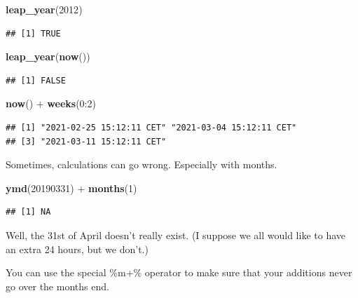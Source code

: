 \documentclass[]{tufte-book}
\newenvironment{Shaded}{}{}
\newcommand{\DecValTok}[1]{\textcolor[rgb]{0.25,0.63,0.44}{#1}}
\newcommand{\KeywordTok}[1]{\textcolor[rgb]{0.00,0.44,0.13}{\textbf{#1}}}
\newcommand{\NormalTok}[1]{#1}
\newcommand{\OperatorTok}[1]{\textcolor[rgb]{0.40,0.40,0.40}{#1}}
\newcommand{\StringTok}[1]{\textcolor[rgb]{0.25,0.44,0.63}{#1}}
\begin{document}
\begin{Shaded}
\begin{Highlighting}[]
\KeywordTok{leap_year}\NormalTok{(}\DecValTok{2012}\NormalTok{)}
\end{Highlighting}
\end{Shaded}

\begin{verbatim}
## [1] TRUE
\end{verbatim}

\begin{Shaded}
\begin{Highlighting}[]
\KeywordTok{leap_year}\NormalTok{(}\KeywordTok{now}\NormalTok{())}
\end{Highlighting}
\end{Shaded}

\begin{verbatim}
## [1] FALSE
\end{verbatim}

\begin{Shaded}
\begin{Highlighting}[]
\KeywordTok{now}\NormalTok{() }\OperatorTok{+}\StringTok{ }\KeywordTok{weeks}\NormalTok{(}\DecValTok{0}\OperatorTok{:}\DecValTok{2}\NormalTok{)}
\end{Highlighting}
\end{Shaded}

\begin{verbatim}
## [1] "2021-02-25 15:12:11 CET" "2021-03-04 15:12:11 CET"
## [3] "2021-03-11 15:12:11 CET"
\end{verbatim}

Sometimes, calculations can go wrong. Especially with months.

\begin{Shaded}
\begin{Highlighting}[]
\KeywordTok{ymd}\NormalTok{(}\DecValTok{20190331}\NormalTok{) }\OperatorTok{+}\StringTok{ }\KeywordTok{months}\NormalTok{(}\DecValTok{1}\NormalTok{)}
\end{Highlighting}
\end{Shaded}

\begin{verbatim}
## [1] NA
\end{verbatim}

Well, the 31st of April doesn't really exist. (I suppose we all would like to have an extra 24 hours, but we don't.)

You can use the special \%m+\% operator to make sure that your additions never go over the months end.
\end{document}
